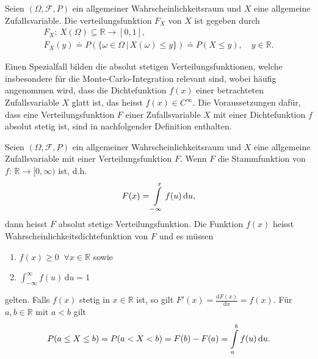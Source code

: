 \documentclass[a4paper,12pt]{article}
\renewcommand{\theenumi}{(\arabic{enumi})}
\renewcommand\labelenumi{\theenumi} %
\begin{document}
\begin{dn}\label{AllgemeineVerteilungsfunktion}
Seien $(\Omega,\mathcal{F},P)$ ein allgemeiner Wahrscheinlichkeitsraum und $X$ eine allgemeine Zufallsvariable. Die verteilungsfunktion $F_X$ von $X$ ist gegeben durch \begin{gather}F_X:\,X(\Omega) \subseteq \mathbb{R} \rightarrow [0,1],\\ F_X(y) \doteq P(\{\omega \in \Omega \, |\,X(\omega) \leq y\}) \doteq P(X\leq y), \quad y \in \mathbb{R}.\end{gather}
\end{dn}

Einen Spezialfall bilden die absolut stetigen Verteilungsfunktionen, welche insbesondere für die Monte-Carlo-Integration relevant sind, wobei häufig angenommen wird, dass die  Dichtefunktion $f(x)$ einer betrachteten Zufallsvariable $X$ glatt ist, das heisst $f(x) \in C^{\infty}.$ Die Voraussetzungen dafür, dass eine Verteilungsfunktion $F$ einer Zufallsvariable $X$ mit einer Dichtefunktion $f$ absolut stetig ist, sind in nachfolgender Definition enthalten.

\begin{dn}\label{AbsolutstetigeVerteilungsfunktion}
Seien $(\Omega,\mathcal{F},P)$ ein allgemeiner Wahrscheinlichkeitsraum und $X$ eine allgemeine Zufallsvariable mit einer Verteilungsfunktion $F.$ Wenn $F$ die Stammfunktion von $f:\,\mathbb{R} \rightarrow [0,\infty)$ ist, d.h. \begin{equation}F(x) = \int\displaylimits_{-\infty}^{x} f(u) \,\mathrm{d}u,\end{equation} dann heisst $F$ absolut stetige Verteilungsfunktion. Die Funktion $f(x)$ heisst Wahrscheinlichkeitsdichtefunktion von $F$ und es müssen \begin{enumerate}
	\renewcommand\theenumi{(\alph{enumi})}
	\renewcommand\labelenumi{\theenumi}
	\item $f(x) \geq 0 \;\; \forall x \in \mathbb{R}$ sowie
	\item $\int_{-\infty}^{\infty} f(u)\,\mathrm{d}u = 1$
\end{enumerate} gelten. Falls $f(x)$ stetig in $x \in \mathbb{R}$ ist, so gilt $F'(x) = \frac{\mathrm{d}F(x)}{\mathrm{d}x} = f(x).$ Für $a,b \in \mathbb{R}$ mit $a < b$ gilt \begin{equation} P(a\leq X \leq b) = P(a<X<b) = F(b) - F(a) = \int\displaylimits_{a}^{b} f(u)\,\mathrm{d}u.\end{equation}
\end{dn}
\end{document}
